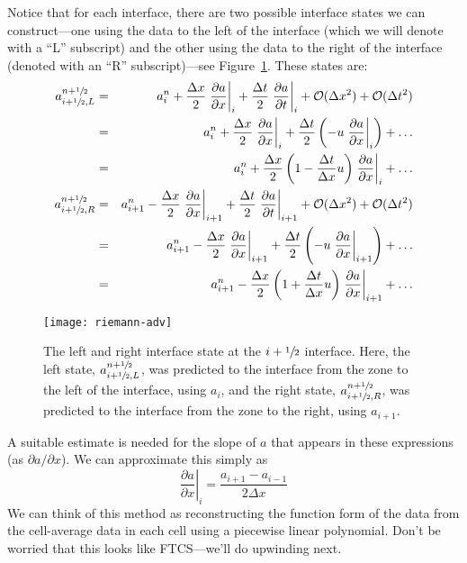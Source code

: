 Notice that for each interface, there are two possible
interface states we can construct---one using the data to the left of
the interface (which we will denote with a ``L'' subscript) and the
other using the data to the right of the interface (denoted with an
``R'' subscript)---see Figure~\ref{fig:riemann_adv}.  These states are:
\begin{eqnarray}
a_{i+{\sfrac{1}{2}},L}^{n+{\sfrac{1}{2}}} &=& a_i^n + \frac{\Delta x}{2} \left .\frac{\partial a}{\partial x} \right |_i + \frac{\Delta t}{2} \left .\frac{\partial a}{\partial t} \right |_i + \mathcal{O}(\Delta x^2) + \mathcal{O}(\Delta t^2) \nonumber \\
    &=& a_i^n + \frac{\Delta x}{2} \left .\frac{\partial a}{\partial x} \right |_i +  \frac{\Delta t}{2} \left ( - u \left .\frac{\partial a}{\partial x} \right |_i \right ) + \ldots \nonumber \\
    &=& a_i^n + \frac{\Delta x}{2} \left ( 1 - \frac{\Delta t}{\Delta x} u \right ) \left .\frac{\partial a}{\partial x} \right |_i +  \ldots \label{eq:statel}\\
a_{i+{\sfrac{1}{2}},R}^{n+{\sfrac{1}{2}}} &=& a_{i+1}^n - \frac{\Delta x}{2} \left .\frac{\partial a}{\partial x} \right |_{i+1} + \frac{\Delta t}{2} \left .\frac{\partial a}{\partial t} \right |_{i+1} + \mathcal{O}(\Delta x^2) + \mathcal{O}(\Delta t^2) \nonumber \\
    &=& a_{i+1}^n - \frac{\Delta x}{2} \left .\frac{\partial a}{\partial x} \right |_{i+1} +  \frac{\Delta t}{2} \left ( - u \left .\frac{\partial a}{\partial x} \right |_{i+1} \right ) + \ldots \nonumber \\
    &=& a_{i+1}^n - \frac{\Delta x}{2} \left ( 1 + \frac{\Delta t}{\Delta x} u \right ) \left .\frac{\partial a}{\partial x} \right |_{i+1} +  \ldots \label{eq:stater}
\end{eqnarray}
\begin{figure}[t]
\centering
\texttt{[image: riemann-adv]}
\caption[The input state to the Riemann
  problem]{\label{fig:riemann_adv} The left and right interface state
  at the $i+{\sfrac{1}{2}}$ interface.  Here, the left state,
  $a_{i+{\sfrac{1}{2}},L}^{n+{\sfrac{1}{2}}}$, was predicted to the interface from
  the zone to the left of the interface, using $a_i$, and the right
  state, $a_{i+{\sfrac{1}{2}},R}^{n+{\sfrac{1}{2}}}$, was predicted to the interface
  from the zone to the right, using $a_{i+1}$.}
\end{figure}

A suitable estimate is needed for the slope of $a$ that appears in
these expressions (as $\partial a/\partial x$).  We can approximate
this simply as
\begin{equation}
\left . \frac{\partial a}{\partial x}\right |_i = \frac{a_{i+1} - a_{i-1}}{2 \Delta x} \label{eq:slopecentered}
\end{equation}
We can think of this method as reconstructing the function form of the
data from the cell-average data in each cell using a piecewise linear
polynomial.  Don't be worried that this looks like FTCS---we'll do
upwinding next.



